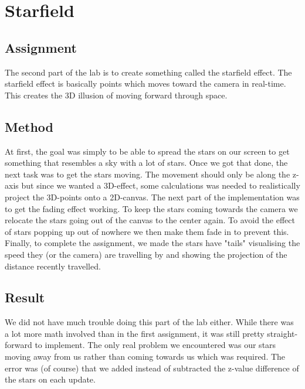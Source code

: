 \documentclass[a4paper,11pt]{article}
\begin{document}
\clearpage
\section{Starfield}
\subsection{Assignment}
The second part of the lab is to create something called the starfield effect. The starfield effect is basically points which moves toward the camera in real-time. This creates the 3D illusion of moving forward through space.
\subsection{Method}
At first, the goal was simply to be able to spread the stars on our screen to get something that resembles a sky with a lot of stars. Once we got that done, the next task was to get the stars moving. The movement should only be along the z-axis but since we wanted a 3D-effect, some calculations was needed to realistically project the 3D-points onto a 2D-canvas. The next part of the implementation was to get the fading effect working. To keep the stars coming towards the camera we relocate the stars going out of the canvas to the center again. To avoid the effect of stars popping up out of nowhere we then make them fade in to prevent this. Finally, to complete the assignment, we made the stars have "tails" visualising the speed they (or the camera) are travelling by and showing the projection of the distance recently travelled. 
\subsection{Result}
We did not have much trouble doing this part of the lab either. While there was a lot more math involved than in the first assignment, it was still pretty straight-forward to implement. The only real problem we encountered was our stars moving away from us rather than coming towards us which was required. The error was (of course) that we added instead of subtracted the z-value difference of the stars on each update.
\end{document}

